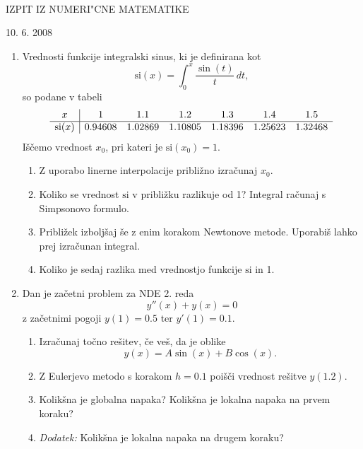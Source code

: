 \
\begin{center}
    {\large IZPIT IZ NUMERI"CNE MATEMATIKE}
    
    10. 6. 2008
\end{center}
\vspace{1.5cm}
\newcommand{\si}{\mathrm{si}}
\begin{enumerate}
    \item 
	Vrednosti funkcije integralski sinus, ki je definirana kot
	\[\si(x)=\int_0^x \frac{\sin(t)}{t}\,dt,\] 
	so podane v tabeli
	\[\begin{array}{c|cccccc}
	x& 1&	1.1&	1.2&	1.3&	1.4&	1.5\cr\hline
	\si(x)&0.94608&   1.02869&   1.10805&   1.18396&   1.25623&1.32468
    \end{array}\]
    Iščemo vrednost \(x_0\), pri kateri je \(\si(x_0)=1\).
    \begin{enumerate}
	\item Z uporabo linerne interpolacije približno izračunaj \(x_0.\) 
	\item Koliko se vrednost \(\si\) v približku razlikuje od 1? 
	    Integral računaj s Simpsonovo formulo.
	\item Približek izboljšaj še z enim korakom Newtonove metode. Uporabiš lahko prej izračunan integral. 
	\item Koliko je sedaj razlika med vrednostjo funkcije \(\si\) in 1.
	    \end{enumerate}
\item  
    Dan je začetni problem za NDE 2. reda
	\[y''(x)+y(x)=0\] z začetnimi pogoji $y(1)=0.5$ ter $y'(1)=0.1$.
    \begin{enumerate}
	\item
	Izračunaj točno rešitev, če veš, da je oblike
	\[y(x)=A\sin(x)+B\cos(x).\]
    \item Z Eulerjevo metodo s korakom $h=0.1$ poišči vrednost rešitve 
	$y(1.2)$. 
    \item Kolikšna je globalna napaka?
	Kolikšna je lokalna napaka na prvem koraku?
    \item
	\emph{Dodatek:} Kolikšna je  lokalna napaka na drugem koraku?	    
    \end{enumerate}
\end{enumerate}
